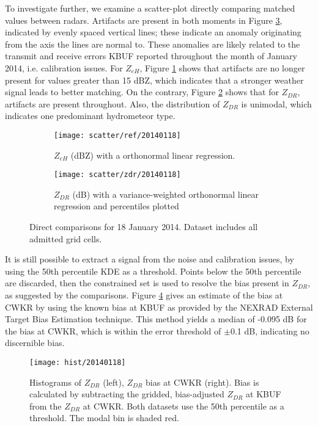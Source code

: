 To investigate further, we examine a scatter-plot directly comparing matched values between radars.
Artifacts are present in both moments in Figure
\ref{fig:scatter_20140118}, indicated by evenly spaced vertical lines; these indicate an anomaly
originating from the axis the lines are normal to. These anomalies are likely related to the transmit and receive errors KBUF reported throughout the month of January 2014, i.e. calibration issues. For
$Z_{eH}$, Figure \ref{fig:scatter_ref_20140118} shows that artifacts are no longer present for values
greater than 15 dBZ, which indicates that a
stronger weather signal leads to better matching. On the contrary, Figure \ref{fig:scatter_zdr_20140118}
shows that for $Z_{DR}$, artifacts are present throughout. Also, the distribution of $Z_{DR}$ is unimodal, which indicates one predominant hydrometeor type. 
\begin{figure}[H]
\centering
   \begin{subfigure}[t]{0.48\linewidth}
     \texttt{[image: scatter/ref/20140118]}
     \caption{$Z_{eH}$ (dBZ) with a orthonormal linear regression.}\label{fig:scatter_ref_20140118}
   \end{subfigure}
   \begin{subfigure}[t]{0.48\linewidth}
     \texttt{[image: scatter/zdr/20140118]}
     \caption{$Z_{DR}$ (dB) with a variance-weighted orthonormal linear regression and percentiles plotted}\label{fig:scatter_zdr_20140118}
   \end{subfigure}
\caption{Direct comparisons for 18 January 2014. Dataset includes all admitted grid cells.} \label{fig:scatter_20140118}
\end{figure}

It is still possible to extract a signal from the noise and calibration issues, by using the 50th percentile KDE as a threshold. Points below the 50th percentile are discarded, then the constrained set is used to resolve the bias present in
$Z_{DR}$, as suggested by the comparisons. Figure \ref{fig:hist_20140118} gives an estimate of the
bias at CWKR by using the known bias at KBUF as provided by the NEXRAD
External Target Bias Estimation technique. This method yields a median of -0.095 dB for the bias at CWKR, which is within the error threshold of $\pm$0.1 dB, indicating no discernible bias.

\begin{figure}[H]
\texttt{[image: hist/20140118]}\centering
\caption{Histograms of $Z_{DR}$ (left), $Z_{DR}$ bias at CWKR (right). Bias is calculated by subtracting the gridded, bias-adjusted $Z_{DR}$ at KBUF from the
$Z_{DR}$ at CWKR. Both datasets use the 50th percentile as a threshold. The modal bin is shaded red.} 
\label{fig:hist_20140118}
\end{figure}



